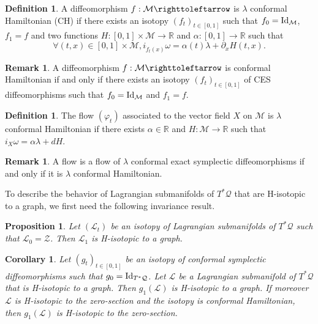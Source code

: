 \documentclass[10pt]{amsart}
\newtheorem{corollary}{Corollary}
\newtheorem{proposition}{Proposition}
\theoremstyle{definition}
\newtheorem{remark}[theorem]{Remark}
\newtheorem{definition}[theorem]{Definition}
\def\R{\mathbb{R}}
\def\cL{{\mathcal L}}
\def\cM{{\mathcal M}}
\def\cQ{{\mathcal Q}}
\def\cZ{{\mathcal Z}}
\begin{document}
\begin{definition}
A diffeomorphism $f: \cM \righttoleftarrow$ is $\lambda$ conformal Hamiltonian (CH) if there exists an isotopy $(f_t)_{t\in[0, 1]}$ such that $f_0={\rm Id}_\cM$, $f_1=f$ and two functions $H:[0, 1]\times \cM\to \R$ and $\alpha:[0, 1]\to \R$ such that
\[
\forall (t, x)\in [0, 1]\times \cM, i_{\dot f_t(x)}\omega=\alpha(t)\lambda+\partial_xH(t, x).
\]
\end{definition}

\begin{remark}
A diffeomorphism $f: \cM \righttoleftarrow$ is conformal Hamiltonian if and only if there exists an isotopy $(f_t)_{t\in[0, 1]}$ of CES diffeomorphisms such that $f_0={\rm Id}_\cM$ and $f_1=f$.
\end{remark}

\begin{definition}
The flow $(\varphi_t)$ associated to the vector field $X$ on $\cM$ is $\lambda$ conformal Hamiltonian if there exists $\alpha\in \R$ and $H:\cM\to \R$ such that $i_X\omega=\alpha \lambda +dH$.
\end{definition}

\begin{remark}
A flow is a flow of $\lambda$ conformal exact symplectic diffeomorphisms if and only if it is $\lambda$ conformal Hamiltonian.
\end{remark}

To describe the behavior of Lagrangian submanifolds of $T^*\cQ$ that are H-isotopic to a graph, we first need the following invariance result.
\begin{proposition}
\label{Pisotopytograph}
Let $(\cL_t)$ be an isotopy of Lagrangian submanifolds of $T^*\cQ$ such that $\cL_0=\cZ$. Then $\cL_1$ is H-isotopic to a graph.
\end{proposition}

\begin{corollary}
\label{PHisotopytograph}
Let $(g_t)_{t\in[0, 1]}$ be an isotopy of conformal symplectic diffeomorphisms such that $g_0={\rm Id}_{T^*\cQ}$. Let $\cL$ be a Lagrangian submanifold of $T^*\cQ$ that is H-isotopic to a graph. Then $g_1(\cL)$ is H-isotopic to a graph. 
If moreover $\cL$ is H-isotopic to the zero-section and the isotopy is conformal Hamiltonian, then $g_1(\cL)$ is H-isotopic to the zero-section.
\end{corollary}
\end{document}
